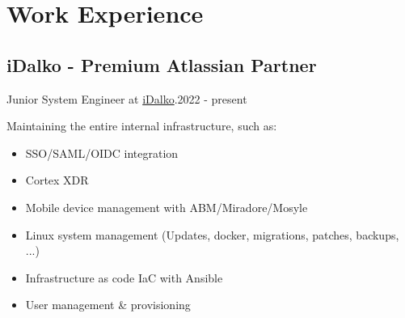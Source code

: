 \section{Work Experie\textcolor{mycolor}{nce}}
  \subsection{iDalko - Premium Atlassian Partner}
    Junior System Engineer at {\href{https://www.idalko.com}{iDalko}}.{\textcolor{mygrey}{\hspace*{\fill}2022 - present}}

    Maintaining the entire internal infrastructure, such as:

    \begin{itemize}
      \item SSO/SAML/OIDC integration
      \item Cortex XDR
      \item Mobile device management with ABM/Miradore/Mosyle
      \item Linux system management (Updates, docker, migrations, patches, backups, ...)
      \item Infrastructure as code IaC with Ansible
      \item User management & provisioning
    \end{itemize}